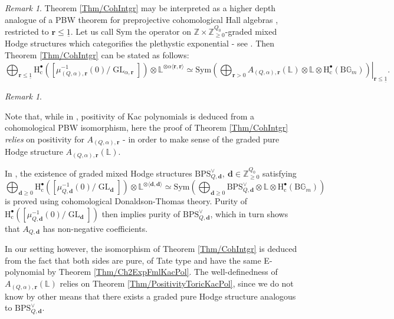 \documentclass[11pt,english]{article}
\numberwithin{equation}{section}
\numberwithin{figure}{section}
\theoremstyle{definition}
\theoremstyle{plain}
\theoremstyle{remark}
\newtheorem{rmk}[df]{Remark}
\DeclareMathOperator{\GL}{GL}
\newcommand\dd{\mathbf{d}}
\newcommand\rr{\mathbf{r}}
\newcommand\HH{\mathrm{H}}
\newcommand\ZZ{\mathbb{Z}}
\begin{document}
\begin{rmk}

Theorem \ref{Thm/CohIntgr} may be interpreted as a higher depth analogue
of a PBW theorem for preprojective cohomological Hall algebras \cite{Dav23c},
restricted to $\rr\leq\underline{1}$. Let us call $\mathrm{Sym}$
the operator on $\ZZ\times\ZZ_{\geq0}^{Q_{0}}$-graded mixed Hodge
structures which categorifies the plethystic exponential - see \cite[\S 3.2]{DM20}.
Then Theorem \ref{Thm/CohIntgr} can be stated as follows:\[
\bigoplus_{\rr\leq\underline{1}}\HH_{\mathrm{c}}^{\bullet}\left(\left[\mu_{(Q,\alpha),\rr}^{-1}(0)/\GL_{\alpha,\rr}\right]\right)\otimes\mathbb{L}^{\otimes\alpha\langle\rr,\rr\rangle}
\simeq
\mathrm{Sym}
\left.
\left(
\bigoplus_{\rr>0}A_{(Q,\alpha),\rr}(\mathbb{L})\otimes\mathbb{L}\otimes \HH_{\mathrm{c}}^{\bullet}(\mathrm{B}\mathbb{G}_m)
\right)
\right\vert_{\rr\leq\underline{1}}.
\]

\end{rmk}

\begin{rmk} \label{Rmk/CohUpgrade=000026Positivity}

Note that, while in \cite{Dav18,Dav23c}, positivity of Kac polynomials
is deduced from a cohomological PBW isomorphism, here the proof of
Theorem \ref{Thm/CohIntgr} \textit{relies} on positivity for $A_{(Q,\alpha),\rr}$
- in order to make sense of the graded pure Hodge structure $A_{(Q,\alpha),\rr}(\mathbb{L})$.

In \cite{Dav23c}, the existence of graded mixed Hodge structures
$\mathrm{BPS}_{Q,\dd}^{\vee},\ \dd\in\ZZ_{\geq0}^{Q_{0}}$ satisfying\[
\bigoplus_{\dd\geq0}
\HH_{\mathrm{c}}^{\bullet}\left(\left[\mu_{Q,\dd}^{-1}(0)/\GL_{\dd}\right]\right)\otimes\mathbb{L}^{\otimes\langle\dd,\dd\rangle}
\simeq
\mathrm{Sym}
\left(
\bigoplus_{\dd\geq0}\mathrm{BPS}_{Q,\dd}^{\vee}\otimes\mathbb{L}\otimes \HH_{\mathrm{c}}^{\bullet}(\mathrm{B}\mathbb{G}_m)
\right)
\] is proved using cohomological Donaldson-Thomas theory. Purity of
$\HH_{\mathrm{c}}^{\bullet}\left(\left[\mu_{Q,\dd}^{-1}(0)/\GL_{\dd}\right]\right)$
then implies purity of $\mathrm{BPS}_{Q,\dd}^{\vee}$, which in turn
shows that $A_{Q,\dd}$ has non-negative coefficients.

In our setting however, the isomorphism of Theorem \ref{Thm/CohIntgr}
is deduced from the fact that both sides are pure, of Tate type and
have the same E-polynomial by Theorem \ref{Thm/Ch2ExpFmlKacPol}.
The well-definedness of $A_{(Q,\alpha),\rr}(\mathbb{L})$ relies on
Theorem \ref{Thm/PositivityToricKacPol}, since we do not know by
other means that there exists a graded pure Hodge structure analogous
to $\mathrm{BPS}_{Q,\dd}^{\vee}$.

\end{rmk}
\end{document}
